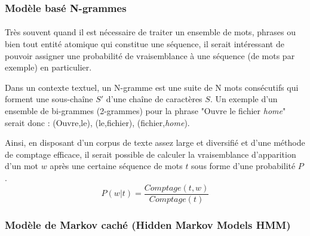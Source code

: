 	\subsubsection{Modèle basé N-grammes}
	\paragraph{}
	Très souvent quand il est nécessaire de traiter un ensemble de mots, phrases ou bien tout entité atomique qui constitue une séquence, il serait intéressant de pouvoir assigner une probabilité de vraisemblance à une séquence (de mots par exemple) en particulier. 
	\par Dans un contexte textuel, un N-gramme est une suite de N mots consécutifs qui forment une sous-chaîne $S\prime$ d'une chaîne de caractères $S$. Un exemple d'un ensemble de bi-grammes (2-grammes) pour la phrase "Ouvre le fichier \textit{home}" serait donc : (Ouvre,le), (le,fichier), (fichier,\textit{home}).
	\par 
	Ainsi, en disposant d'un corpus de texte assez large et diversifié et d'une méthode de comptage efficace, il serait possible de calculer la vraisemblance d'apparition d'un mot $w$ après une certaine séquence de mots $t$ sous forme d'une probabilité $P$ \cite{nlp_ngrams}.
	\begin{equation}
		P(w|t) = \frac{Comptage(t,w)}{Comptage(t)}
	\end{equation}
	\subsubsection{Modèle de Markov caché (Hidden Markov Models HMM)}
